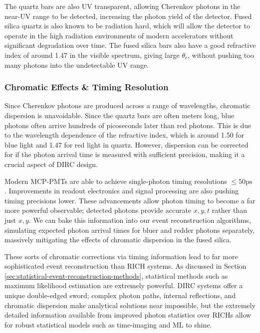 The quartz bars are also UV transparent, allowing Cherenkov photons in the near-UV range to be detected, increasing the photon yield of the detector. Fused silica quartz is also known to be radiation hard, which will allow the detector to operate in the high radiation environments of modern accelerators without significant degradation over time.\nolinebreak\cite{radiation-hardness-silica-HOEK2008190} The fused silica bars also have a good refractive index of around 1.47 in the visible spectrum, giving large \(\theta_c\), without pushing too many photons into the undetectable UV range.

\subsubsection{\label{sec:timing-resolution}Chromatic Effects \& Timing Resolution}

Since Cherenkov photons are produced across a range of wavelengths, chromatic dispersion is unavoidable. Since the quartz bars are often meters long, blue photons often arrive hundreds of picoseconds later than red photons. This is due to the wavelength dependence of the refractive index, which is around 1.50 for blue light and 1.47 for red light in quartz. However, dispersion can be corrected for if the photon arrival time is measured with sufficient precision, making it a crucial aspect of DIRC design. 

Modern MCP-PMTs are able to achieve single-photon timing resolutions \(\leq 50\text{ps}\) \nolinebreak\cite{Lyashenko_2026,DavidsonPHOTEK_2025,QianIHEP_2024}. Improvements in readout electronics and signal processing are also pushing timing precisions lower.\nolinebreak\cite{electronics-readout-KEIZER2024169664} These advancements allow photon timing to become a far more powerful observable; detected photons provide accurate \(x, y, t\) rather than just \(x, y\). We can bake this information into our event reconstruction algorithms, simulating expected photon arrival times for bluer and redder photons separately, massively mitigating the effects of chromatic dispersion in the fused silica. 

These sorts of chromatic corrections via timing information lead to far more sophisticated event reconstruction than RICH systems. As discussed in Section \nolinebreak\ref{sec:statistical-event-reconstruction-methods}, statistical methods such as maximum likelihood estimation are extremely powerful. DIRC systems offer a unique double-edged sword; complex photon paths, internal reflections, and chromatic dispersion make analytical solutions near impossible, but the extremely detailed information available from improved photon statistics over RICHs allow for robust
statistical models such as time-imaging and ML to shine. 

